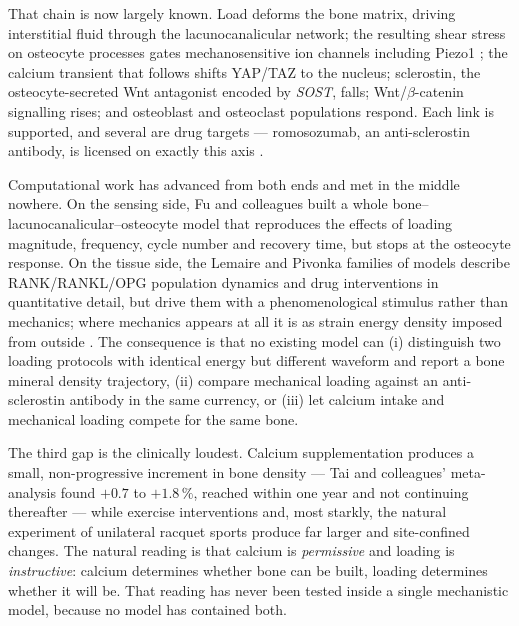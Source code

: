 \documentclass[10pt,letterpaper]{article}
\begin{document}
That chain is now largely known. Load deforms the bone matrix, driving
interstitial fluid through the lacunocanalicular network; the resulting shear
stress on osteocyte processes gates mechanosensitive ion channels including
Piezo1 \cite{li2019}; the calcium transient that follows shifts YAP/TAZ to the
nucleus; sclerostin, the osteocyte-secreted Wnt antagonist encoded by
\emph{SOST}, falls; Wnt/$\beta$-catenin signalling rises; and osteoblast and
osteoclast populations respond. Each link is supported, and several are drug
targets --- romosozumab, an anti-sclerostin antibody, is licensed on exactly
this axis \cite{cosman2016}.

Computational work has advanced from both ends and met in the middle nowhere.
On the sensing side, Fu and colleagues \cite{fu2025} built a whole
bone--lacunocanalicular--osteocyte model that reproduces the effects of
loading magnitude, frequency, cycle number and recovery time, but stops at the
osteocyte response. On the tissue side, the Lemaire \cite{lemaire2004} and
Pivonka \cite{pivonka2008} families of models describe RANK/RANKL/OPG
population dynamics and drug interventions in quantitative detail, but drive
them with a phenomenological stimulus rather than mechanics; where mechanics
appears at all it is as strain energy density imposed from outside
\cite{scheiner2013}. The consequence is that no existing model can (i)
distinguish two loading protocols with identical energy but different waveform
and report a bone mineral density trajectory, (ii) compare mechanical loading
against an anti-sclerostin antibody in the same currency, or (iii) let calcium
intake and mechanical loading compete for the same bone.

The third gap is the clinically loudest. Calcium supplementation produces a
small, non-progressive increment in bone density --- Tai and colleagues'
meta-analysis \cite{tai2015} found $+0.7$ to $+1.8\,\%$, reached within one
year and not continuing thereafter --- while exercise interventions and, most
starkly, the natural experiment of unilateral racquet sports
\cite{haapasalo2000} produce far larger and site-confined changes. The natural
reading is that calcium is \emph{permissive} and loading is \emph{instructive}:
calcium determines whether bone can be built, loading determines whether it
will be. That reading has never been tested inside a single mechanistic model,
because no model has contained both.
\end{document}
